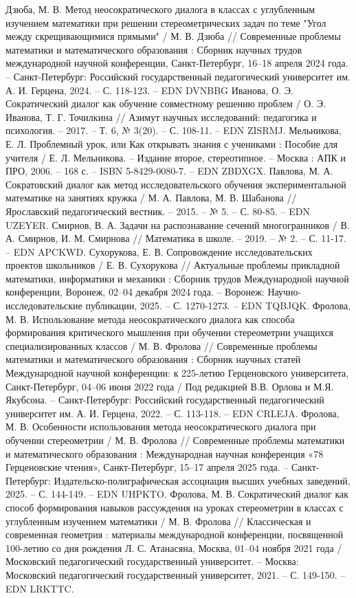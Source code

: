 \documentclass[a4paper,14pt,russian]{extreport}
\begin{document}
\begin{thebibliography}{}
\bibitem{} Дзюба, М. В. Метод неосократического диалога в классах с углубленным изучением математики при решении стереометрических задач по теме "Угол между скрещивающимися прямыми" / М. В. Дзюба // Современные проблемы математики и математического образования : Сборник научных трудов международной научной конференции, Санкт-Петербург, 16–18 апреля 2024 года. – Санкт-Петербург: Российский государственный педагогический университет им. А. И. Герцена, 2024. – С. 118-123. – EDN DVNBBG
\bibitem{} Иванова, О. Э. Сократический диалог как обучение совместному решению проблем / О. Э. Иванова, Т. Г. Точилкина // Азимут научных исследований: педагогика и психология. – 2017. – Т. 6, № 3(20). – С. 108-11. – EDN ZISRMJ.
\bibitem{} Мельникова, Е. Л. Проблемный урок, или Как открывать знания с учениками : Пособие для учителя / Е. Л. Мельникова. – Издание второе, стереотипное. – Москва : АПК и ПРО, 2006. – 168 с. – ISBN 5-8429-0080-7. – EDN ZBDXGX.
\bibitem{} Павлова, М. А. Сократовский диалог как метод исследовательского обучения экспериментальной математике на занятиях кружка / М. А. Павлова, М. В. Шабанова // Ярославский педагогический вестник. – 2015. – № 5. – С. 80-85. – EDN UZEYER.
\bibitem{}Смирнов, В. А. Задачи на распознавание сечений многогранников / В. А. Смирнов, И. М. Смирнова // Математика в школе. – 2019. – № 2. – С. 11-17. – EDN APCKWD.
\bibitem{}Сухорукова, Е. В. Сопровождение исследовательских проектов школьников / Е. В. Сухорукова // Актуальные проблемы прикладной математики, информатики и механики : Сборник трудов Международной научной конференции, Воронеж, 02–04 декабря 2024 года. – Воронеж: Научно-исследовательские публикации, 2025. – С. 1270-1273. – EDN TQBJQK.
\bibitem{}Фролова, М. В. Использование метода неосократического диалога как способа формирования критического мышления при обучении стереометрии учащихся специализированных классов / М. В. Фролова // Современные проблемы математики и математического образования : Сборник научных статей Международной научной конференции: к 225-летию Герценовского университета, Санкт-Петербург, 04–06 июня 2022 года / Под редакцией В.В. Орлова и М.Я. Якубсона. – Санкт-Петербург: Российский государственный педагогический университет им. А. И. Герцена, 2022. – С. 113-118. – EDN CRLEJA.
\bibitem{}Фролова, М. В. Особенности использования метода неосократического диалога при обучении стереометрии / М. В. Фролова // Современные проблемы математики и математического образования : Международная научная конференция «78 Герценовские чтения», Санкт-Петербург, 15–17 апреля 2025 года. – Санкт-Петербург: Издательско-полиграфическая ассоциация высших учебных заведений, 2025. – С. 144-149. – EDN UHPKTO.
\bibitem{}Фролова, М. В. Сократический диалог как способ формирования навыков рассуждения на уроках стереометрии в классах с углубленным изучением математики / М. В. Фролова // Классическая и современная геометрия : материалы международной конференции, посвященной 100-летию со дня рождения Л. С. Атанасяна, Москва, 01–04 ноября 2021 года / Московский педагогический государственный университет. – Москва: Московский педагогический государственный университет, 2021. – С. 149-150. – EDN LRKTTC.


\end{thebibliography}
\end{document}
